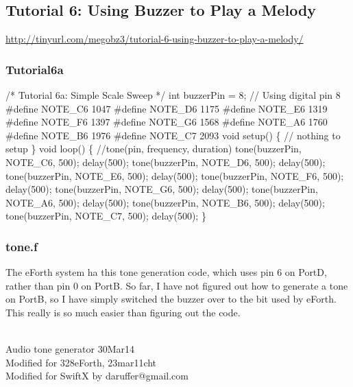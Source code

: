 \documentclass[10pt,english]{article}
\begin{document}
\subsection{Tutorial 6: Using Buzzer to Play a Melody}

\url{http://tinyurl.com/megobz3/tutorial-6-using-buzzer-to-play-a-melody/}


\subsubsection{Tutorial6a}

\nwenddocs{}\endmoddef
/*   Tutorial 6a: Simple Scale Sweep */
int buzzerPin = 8;    // Using digital pin 8
#define NOTE_C6  1047
#define NOTE_D6  1175
#define NOTE_E6  1319
#define NOTE_F6  1397
#define NOTE_G6  1568
#define NOTE_A6  1760
#define NOTE_B6  1976
#define NOTE_C7  2093
void setup() \{
  // nothing to setup
\}
void loop() \{
  //tone(pin, frequency, duration)
  tone(buzzerPin, NOTE_C6, 500);
  delay(500);
  tone(buzzerPin, NOTE_D6, 500);
  delay(500);
  tone(buzzerPin, NOTE_E6, 500);
  delay(500);
  tone(buzzerPin, NOTE_F6, 500);
  delay(500);
  tone(buzzerPin, NOTE_G6, 500);
  delay(500);
  tone(buzzerPin, NOTE_A6, 500);
  delay(500);
  tone(buzzerPin, NOTE_B6, 500);
  delay(500);
  tone(buzzerPin, NOTE_C7, 500);
  delay(500);
\}
\nwendcode{}\nwdocspar


\subsubsection{tone.f}

The eForth system ha this tone generation code, which uses pin 6 on
PortD, rather than pin 0 on PortB. So far, I have not figured out
how to generate a tone on PortB, so I have simply switched the buzzer
over to the bit used by eForth. This really is so much easier than
figuring out the code.

\nwenddocs{}\endmoddef
\\ Audio tone generator                      30Mar14
\\ Modified for 328eForth, 23mar11cht
\\ Modified for SwiftX by daruffer@gmail.com
\end{document}
